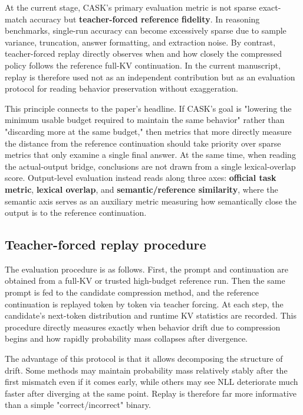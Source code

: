 At the current stage, CASK's primary evaluation metric is not sparse exact-match accuracy but \textbf{teacher-forced reference fidelity}. In reasoning benchmarks, single-run accuracy can become excessively sparse due to sample variance, truncation, answer formatting, and extraction noise. By contrast, teacher-forced replay directly observes when and how closely the compressed policy follows the reference full-KV continuation. In the current manuscript, replay is therefore used not as an independent contribution but as an evaluation protocol for reading behavior preservation without exaggeration.


This principle connects to the paper's headline. If CASK's goal is "lowering the minimum usable budget required to maintain the same behavior" rather than "discarding more at the same budget," then metrics that more directly measure the distance from the reference continuation should take priority over sparse metrics that only examine a single final answer. At the same time, when reading the actual-output bridge, conclusions are not drawn from a single lexical-overlap score. Output-level evaluation instead reads along three axes: \textbf{official task metric}, \textbf{lexical overlap}, and \textbf{semantic/reference similarity}, where the semantic axis serves as an auxiliary metric measuring how semantically close the output is to the reference continuation.


\subsection{Teacher-forced replay procedure}


The evaluation procedure is as follows. First, the prompt and continuation are obtained from a full-KV or trusted high-budget reference run. Then the same prompt is fed to the candidate compression method, and the reference continuation is replayed token by token via teacher forcing. At each step, the candidate's next-token distribution and runtime KV statistics are recorded. This procedure directly measures exactly when behavior drift due to compression begins and how rapidly probability mass collapses after divergence.


The advantage of this protocol is that it allows decomposing the structure of drift. Some methods may maintain probability mass relatively stably after the first mismatch even if it comes early, while others may see NLL deteriorate much faster after diverging at the same point. Replay is therefore far more informative than a simple "correct/incorrect" binary.


